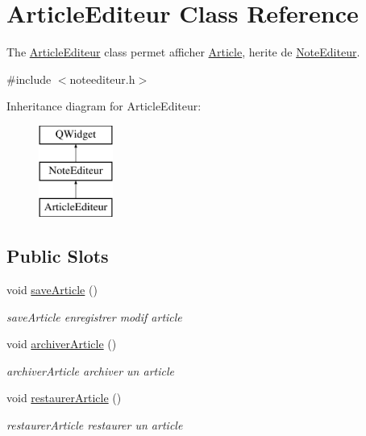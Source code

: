 \hypertarget{class_article_editeur}{}\section{Article\+Editeur Class Reference}
\label{class_article_editeur}


The \hyperlink{class_article_editeur}{Article\+Editeur} class permet afficher \hyperlink{class_article}{Article}, herite de \hyperlink{class_note_editeur}{Note\+Editeur}.  




{\ttfamily \#include $<$noteediteur.\+h$>$}

Inheritance diagram for Article\+Editeur\+:\begin{figure}[H]
\begin{center}
\leavevmode
\includegraphics[height=3.000000cm]{class_article_editeur}
\end{center}
\end{figure}
\subsection*{Public Slots}
\begin{DoxyCompactItemize}
\item 
\mbox{\label{class_article_editeur_a092cbfb381018789aa15cdfa1b31b63e}} 
void \hyperlink{class_article_editeur_a092cbfb381018789aa15cdfa1b31b63e}{save\+Article} ()
\begin{DoxyCompactList}\small\item\em save\+Article enregistrer modif article \end{DoxyCompactList}\item 
\mbox{\label{class_article_editeur_aba5870b0dac1d6da7a3e585547038e09}} 
void \hyperlink{class_article_editeur_aba5870b0dac1d6da7a3e585547038e09}{archiver\+Article} ()
\begin{DoxyCompactList}\small\item\em archiver\+Article archiver un article \end{DoxyCompactList}\item 
\mbox{\label{class_article_editeur_a91d3782a6afb9e6b769a319fb5c42a4c}} 
void \hyperlink{class_article_editeur_a91d3782a6afb9e6b769a319fb5c42a4c}{restaurer\+Article} ()
\begin{DoxyCompactList}\small\item\em restaurer\+Article restaurer un article \end{DoxyCompactList}\end{DoxyCompactItemize}
